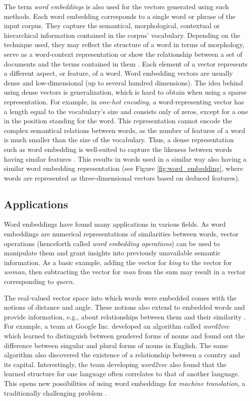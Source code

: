 The term \textit{word embeddings} is also used for the vectors generated using such methods. Each word embedding corresponds to a single word or phrase of the input corpus. They capture the semantical, morphological, contextual or hierarchical information contained in the corpus' vocabulary. Depending on the technique used, they may reflect the structure of a word in terms of morphology, serve as a word-context representation or show the relationship between a set of documents and the terms contained in them \cite{we-intro}. Each element of a vector represents a different aspect, or feature, of a word. Word embedding vectors are usually dense and low-dimensional (up to several hundred dimensions). The idea behind using dense vectors is generalization, which is hard to obtain when using a sparse representation. For example, in \textit{one-hot encoding}, a word-representing vector has a length equal to the vocabulary's size and consists only of zeros, except for a one in the position standing for the word. This representation cannot encode the complex semantical relations between words, as the number of features of a word is much smaller than the size of the vocabulary. Thus, a dense representation such as word embedding is well-suited to capture the likeness between words having similar features \cite{goldberg2017neural} \cite{bengio2003neural}. This results in words used in a similar way also having a similar word embedding representation (see Figure \ref{fig:word_embedding}, where words are represented as three-dimensional vectors based on deduced features).

\subsection{Applications}
Word embeddings have found many applications in various fields. As word embeddings are numerical representations of similarities between words, vector operations (henceforth called \textit{word embedding operations}) can be used to manipulate them and grant insights into previously unavailable semantic information. As a basic example, adding the vector for \textit{king} to the vector for \textit{woman}, then subtracting the vector for \textit{man} from the sum may result in a vector corresponding to \textit{queen}.

The real-valued vector space into which words were embedded comes with the notions of distance and angle. These notions also extend to embedded words and provide information, e.g., about relationships between them and their similarity \cite{we-intro-huang}. For example, a team at Google Inc. developed an algorithm called \textit{word2vec} which learned to distinguish between gendered forms of nouns and found out the difference between singular and plural forms of nouns in English. The same algorithm also discovered the existence of a relationship between a country and its capital. Interestingly, the team developing \textit{word2vec} also found that the learned structure for one language often correlates to that of another language. This opens new possibilities of using word embeddings for \textit{machine translation}, a traditionally challenging problem \cite{mikolov2013exploiting}. 

